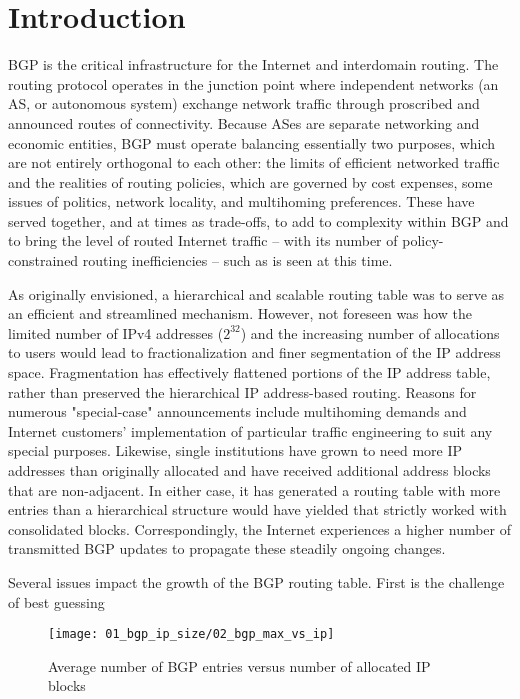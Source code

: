 \section{Introduction}

BGP is the critical infrastructure for the Internet and interdomain routing.  The routing protocol operates in the junction point where independent networks (an AS, or autonomous system) exchange network traffic through proscribed and announced routes of connectivity.  Because ASes are separate networking and economic entities, BGP must operate balancing essentially two purposes, which are not entirely orthogonal to each other: the limits of efficient networked traffic and the realities of routing policies, which are governed by cost expenses, some issues of politics, network locality, and multihoming preferences.  These have served together, and at times as trade-offs, to add to complexity within BGP and to bring the level of routed Internet traffic -- with its number of policy-constrained routing inefficiencies -- such as is seen at this time.

As originally envisioned, a hierarchical and scalable routing table was to serve as an efficient and streamlined mechanism.  However, not foreseen was how the limited number of IPv4 addresses ($2^{32}$) and the increasing number of allocations to users would lead to fractionalization and finer segmentation of the IP address space.  Fragmentation has effectively flattened portions of the IP address table, rather than preserved the hierarchical IP address-based routing.  Reasons for numerous "special-case" announcements include multihoming demands and Internet customers' implementation of particular traffic engineering to suit any special purposes.  Likewise, single institutions have grown to need more IP addresses than originally allocated and have received additional address blocks that are non-adjacent.  In either case, it has generated a routing table with more entries than a hierarchical structure would have yielded that strictly worked with consolidated blocks.  Correspondingly, the Internet experiences a higher number of transmitted BGP updates to propagate these steadily ongoing changes.  

Several issues impact the growth of the BGP routing table.  First is the challenge of best guessing

\begin{figure}[htbp]
	\centering
		\texttt{[image: 01\_bgp\_ip\_size/02\_bgp\_max\_vs\_ip]}
	\caption{Average number of BGP entries versus number of allocated IP blocks}
	\label{fig:BGP vs RIR}
\end{figure}

